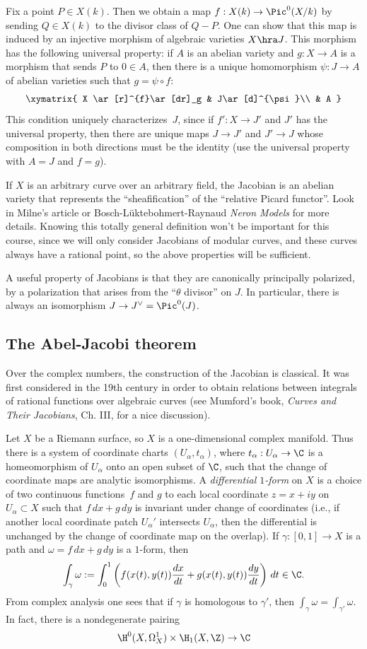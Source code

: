 \documentclass{report}
\begin{document}
Fix a point $P\in X(k)$.  Then we obtain a map $f:X(k)\to
\Pic^0(X/k)$ by sending $Q\in X(k)$ to the divisor class of $Q-P$.
One can show that this map is induced by an injective morphism of
algebraic varieties $X\hra J$.  This morphism has the following
universal property: if $A$ is an abelian variety and $g:X\to A$ is
a morphism that sends $P$ to $0\in A$, then there is a unique
homomorphism $\psi:J\to A$ of abelian varieties such that
$g=\psi\circ f$:
\[
\xymatrix{
 X \ar[r]^{f}\ar[dr]_g & J\ar[d]^{\psi}\\
      & A
 }
\]
This condition uniquely characterizes~$J$, since if $f':X\to J'$
and $J'$ has the universal property, then there are unique maps
$J\to J'$ and $J'\to J$ whose composition in both directions must
be the identity (use the universal property with $A=J$ and $f=g$).

If $X$ is an arbitrary curve over an arbitrary field, the Jacobian
is an abelian variety that represents the ``sheafification'' of
the ``relative Picard functor''.  Look in Milne's article or
Bosch-L\"uktebohmert-Raynaud {\em Neron Models} for more details.
Knowing this totally general definition won't be important for
this course, since we will only consider Jacobians of modular
curves, and these curves always have a rational point, so the
above properties will be sufficient.

A useful property of Jacobians is that they are canonically
principally polarized, by a polarization that arises from the
``$\theta$ divisor'' on $J$.  In particular, there is always an
isomorphism $J\to J^{\vee}=\Pic^0(J)$.

\subsection{The Abel-Jacobi theorem}
Over the complex numbers, the construction of the Jacobian is
classical.  It was first considered in the 19th century in order
to obtain relations between integrals of rational functions over
algebraic curves (see Mumford's book, {\em Curves and Their
Jacobians}, Ch. III, for a nice discussion).

Let $X$ be a Riemann surface, so $X$ is a one-dimensional complex
manifold.  Thus there is a system of coordinate charts $(U_\alpha,
t_\alpha)$, where $t_\alpha:U_\alpha\to \C$ is a homeomorphism of
$U_\alpha$ onto an open subset of $\C$, such that the change of
coordinate maps are analytic isomorphisms.  A {\em differential
$1$-form} on $X$ is a choice of two continuous functions~$f$ and
$g$ to each local coordinate $z=x+iy$ on $U_\alpha\subset X$ such
that $f \,dx + g\,dy$ is invariant under change of coordinates
(i.e., if another local coordinate patch $U_\alpha'$ intersects
$U_\alpha$, then the differential is unchanged by the change of
coordinate map on the overlap).  If $\gamma:[0,1]\to X$ is a path
and $\omega=f\,dx + g\,dy$ is a $1$-form, then
\[
  \int_{\gamma} \omega :=
  \int_{0}^{1} \left( f(x(t),y(t)) \frac{dx}{dt} +  g(x(t),y(t))\frac{dy}{dt}\right)\, dt \in \C.
\]
From complex analysis one sees that if $\gamma$ is homologous to
$\gamma'$, then $\int_\gamma \omega = \int_{\gamma'}\omega$.  In
fact, there is a nondegenerate pairing
\[
   \H^0(X,\Omega^1_{X}) \times \H_1(X,\Z) \to \C
\]
\end{document}
